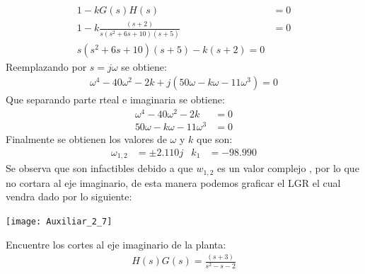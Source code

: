 \documentclass[
  11pt,
  letterpaper,
   addpoints,
   answers
  ]{exam}
\begin{document}
\begin{questions}
\begin{solution}
\begin{align}
    1-kG(s)H(s) &= 0\\
    1-k\frac{(s+2)}{s(s^{2}+6s+10)(s+5)} &= 0\\
    s(s^{2}+6s+10)(s+5)-k(s+2)=0
\end{align}
Reemplazando por $s=j\omega$ se obtiene:
\begin{align}
    \omega^{4}-40\omega^{2}-2k + j(50\omega -k\omega-11\omega^{3})=0
\end{align}
Que separando parte rteal e imaginaria se obtiene:
\begin{align}
    \omega^{4}-40\omega^{2}-2k &= 0\\
    50\omega -k\omega-11\omega^{3} &= 0
\end{align}
Finalmente se obtienen los valores de $\omega$ y $k$ que son:
\begin{align}
    \omega_{1,2} &= \pm 2.110j & k_{1}&= -98.990
\end{align}
Se observa que son infactibles debido a que $w_{1,2}$ es un valor complejo , por lo que no cortara al eje imaginario, de esta manera podemos graficar el LGR el cual vendra dado por lo siguiente:
\begin{center}
    \texttt{[image: Auxiliar\_2\_7]}
  \end{center}
\end{solution}
\question Encuentre los cortes al eje imaginario de la planta:
\begin{align}
    H(s)G(s) = \frac{(s+3)}{s^{2}-s-2}
\end{align}
\begin{solution}

\end{solution}
\end{questions}
\end{document}

